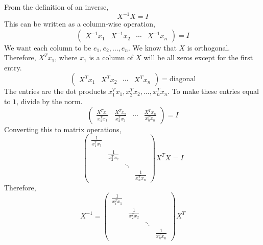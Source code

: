 \documentclass{article}
\begin{document}
From the definition of an inverse,
$$ X^{-1} X = I $$
This can be written as a column-wise operation,
$$ \begin{pmatrix}
  X^{-1} x_1 & X^{-1} x_2 & \cdots & X^{-1} x_n
\end{pmatrix} = I $$
We want each column to be $e_1, e_2, \ldots, e_n$. We know that $X$ is
orthogonal. Therefore, $X^T x_1$, where $x_1$ is a column of $X$ will be all
zeros except for the first entry.
$$ \begin{pmatrix}
  X^T x_1 & X^T x_2 & \cdots & X^T x_n
\end{pmatrix} = \mathrm{diagonal} $$
The entries are the dot products $x_1^T x_1, x_2^T x_2, \ldots, x_n^T x_n$.
To make these entries equal to $1$, divide by the norm.
$$ \begin{pmatrix}
  \frac{X^T x_1}{x_1^T x_1} & \frac{X^T x_2}{x_2^T x_2} & \cdots & \frac{X^T
  x_n}{x_n^T x_n}
\end{pmatrix} = I $$
Converting this to matrix operations,
$$ \begin{pmatrix}
 \frac{1}{x_1^T x_1} &   &   &   \\
   & \frac{1}{x_2^T x_2} & & \\
   & & \ddots & \\
   & & & \frac{1}{x_n^T x_n}
\end{pmatrix} X^T X = I $$
Therefore,
$$ X^{-1} = \begin{pmatrix}
  \frac{1}{x_1^T x_1} &   &   &   \\
   & \frac{1}{x_2^T x_2} & & \\
   & & \ddots & \\
   & & & \frac{1}{x_n^T x_n}
\end{pmatrix} X^T $$
\end{document}
